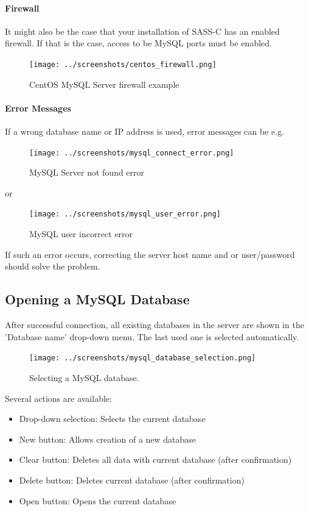 \paragraph{Firewall}

It might also be the case that your installation of SASS-C has an enabled firewall. If that is the case, access to be MySQL ports must be enabled.

\begin{figure}[H]
  \center
    \texttt{[image: ../screenshots/centos\_firewall.png]}
  \caption{CentOS MySQL Server firewall example}
\end{figure}

\paragraph{Error Messages}

If a wrong database name or IP address is used, error messages can be e.g. \\

\begin{figure}[H]
  \center
    \texttt{[image: ../screenshots/mysql\_connect\_error.png]}
  \caption{MySQL Server not found error}
\end{figure}

 or 

\begin{figure}[H]
  \center
    \texttt{[image: ../screenshots/mysql\_user\_error.png]}
  \caption{MySQL user incorrect error}
\end{figure}

If such an error occurs, correcting the server host name and or user/password should solve the problem. 


\subsection{Opening a MySQL Database}
\label{sec:mysql_open_db}

After successful connection, all existing databases in the server are shown in the 'Database name' drop-down menu. The last used one is selected automatically.

\begin{figure}[H]
  \center
    \texttt{[image: ../screenshots/mysql\_database\_selection.png]}
  \caption{Selecting a MySQL database.}
  \label{fig:mysql_db_select}
\end{figure}

Several actions are available:

\begin{itemize}  
\item Drop-down selection: Selects the current database
\item New button: Allows creation of a new database
\item Clear button: Deletes all data with current database (after confirmation)
\item Delete button: Deletes current database (after confirmation)
\item Open button: Opens the current database
\end{itemize} 
